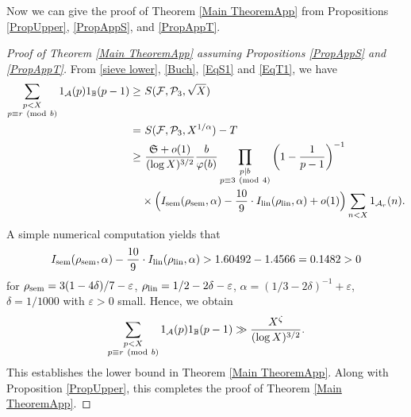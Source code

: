 \documentclass[12pt]{amsart}
\numberwithin{equation}{section}
\theoremstyle{remark}
\theoremstyle{definition}
\newcommand{\imod}[1]{\ (\mathrm{mod}\ #1)}
\begin{document}
Now we can give the proof of Theorem \ref{Main TheoremApp} from Propositions \ref{PropUpper}, \ref{PropAppS}, and \ref{PropAppT}.

\begin{proof}[Proof of Theorem \ref{Main TheoremApp} assuming Propositions \ref{PropAppS} and \ref{PropAppT}]
From \eqref{sieve lower}, \eqref{Buch}, \eqref{EqS1} and \eqref{EqT1}, we have 
\begin{align}
\notag \sum_{\substack{p<X\\p\equiv r\imod b}}1_{\mathcal{A}}(p)1_{\mathbb{B}}(p-1)\geq &~S(\mathcal{F}, \mathcal{P}_3, \sqrt{X})\\
\notag =&~S(\mathcal{F}, \mathcal{P}_3, X^{1/\alpha})-T\\
\notag \geq&~\dfrac{\mathfrak{S} + o(1)}{(\log X)^{3/2}}\dfrac{b}{\varphi(b)}\prod_{\substack{p|b\\p\equiv 3\imod 4}}\bigg(1-\dfrac{1}{p-1}\bigg)^{-1}\\
\notag &\times \Big(I_{\textup{sem}}(\rho_{\textup{sem}}, \alpha)-\dfrac{10}{9}\cdot I_{\textup{lin}}(\rho_{\textup{lin}}, \alpha)+o(1)\Big)\sum_{\substack{n<X}}1_{\mathcal{A}_r}(n).
\end{align}
A simple numerical computation yields that
\begin{align}
\notag I_{\textup{sem}}(\rho_{\textup{sem}}, \alpha)-\dfrac{10}{9}\cdot I_{\textup{lin}}(\rho_{\textup{lin}}, \alpha)>1.60492-1.4566=0.1482 > 0
\end{align}
for $\rho_{\textup{sem}}=3(1-4\delta)/7-\varepsilon$, $\rho_{\textup{lin}}=1/2-2\delta-\varepsilon$, $\alpha=(1/3-2\delta)^{-1} +\varepsilon$, $\delta=1/1000$ with $\varepsilon>0$ small. Hence, we obtain
\begin{align}
\notag \sum_{\substack{p<X\\p\equiv r\imod b}}1_{\mathcal{A}}(p)1_{\mathbb{B}}(p-1)\gg \dfrac{X^{\zeta}}{(\log X)^{3/2}}.
\end{align}
This establishes the lower bound in Theorem \ref{Main TheoremApp}. Along with Proposition \ref{PropUpper}, this completes the proof of Theorem \ref{Main TheoremApp}.
\end{proof}
\end{document}
